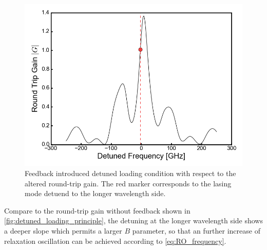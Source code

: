 \begin{figure}[H]
    \centering
    \includegraphics[width=.7\linewidth]{figures/feedback_introduced_detuned_loading_principle.png}
    \caption{Feedback introduced detuned loading condition with respect to the altered round-trip gain. The red marker corresponds to the lasing mode detuend to the longer wavelength side.}
    \label{fig:feedback_introduced_detuned_loading_principle}
\end{figure}

Compare to the round-trip gain without feedback shown in \autoref{fig:detuned_loading_principle}, the detuning at the longer wavelength side shows a deeper slope which permits a larger $B$ parameter, so that an further increase of relaxation oscillation can be achieved according to \autoref{eq:RO_frequency}. 



